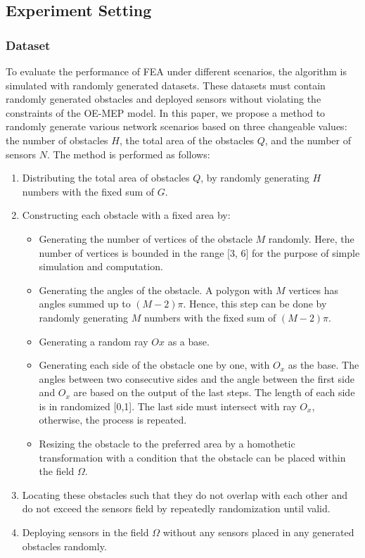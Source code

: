 \documentclass[final]{elsarticle}
\begin{document}
\subsection{Experiment Setting}
\subsubsection{Dataset}
To evaluate the performance of FEA under different scenarios, the algorithm is simulated with randomly generated datasets. These datasets must contain randomly generated obstacles and deployed sensors without violating the constraints of the OE-MEP model. In this paper, we propose a method to randomly generate various network scenarios based on three changeable values: the number of obstacles $H$, the total area of the obstacles $Q$, and the number of sensors $N$. The method is performed as follows: 

\begin{enumerate}
	\item Distributing the total area of obstacles $Q$, by randomly generating $H$ numbers with the fixed sum of $G$.
	\item Constructing each obstacle with a fixed area by:
	\begin{itemize}
		\item Generating the number of vertices of the obstacle $M$ randomly. Here, the number of vertices is bounded in the range [3, 6] for the purpose of simple simulation and computation. 
		\item Generating the angles of the obstacle. A polygon with $M$ vertices has angles summed up to $(M - 2)\pi$. Hence, this step can be done by randomly generating $M$ numbers with the fixed sum of $(M - 2)\pi$.
		\item Generating a random ray $Ox$ as a base.
		\item Generating each side of the obstacle one by one, with $O_x$ as the base. The angles between two consecutive sides and the angle between the first side and $O_x$ are based on the output of the last steps. The length of each side is in randomized [0,1]. The last side must intersect with ray $O_x$, otherwise, the process is repeated.
		\item Resizing the obstacle to the preferred area by a homothetic transformation with a condition that the obstacle can be placed within the field $\Omega$.
	\end{itemize}
	\item Locating these obstacles such that they do not overlap with each other and do not exceed the sensors field by repeatedly randomization until valid.
	\item Deploying sensors in the field $\Omega$ without any sensors placed in any generated obstacles randomly.
\end{enumerate}
\end{document}
